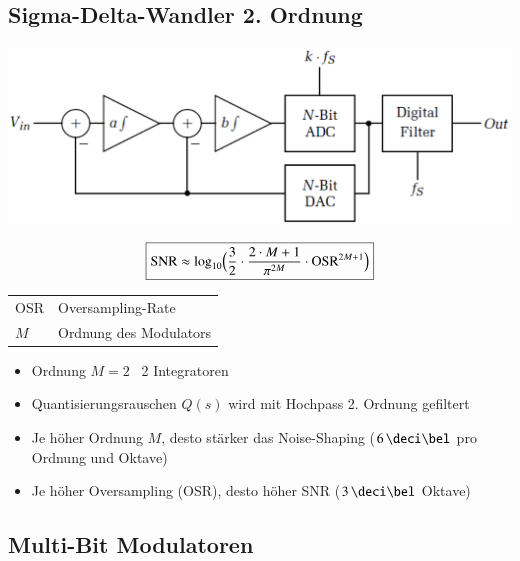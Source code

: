 \subsection{Sigma-Delta-Wandler 2. Ordnung}

\begin{minipage}[c]{0.48\columnwidth}
    \includegraphics[width=\columnwidth]{images/sigma-delta-wandler_ordnung_2.png}
\end{minipage}
\hfill
\begin{minipage}[c]{0.48\columnwidth}
    $$ \boxed{ \text{SNR} \approx \log_{10} \Bigl( \frac{3}{2} \cdot \frac{2 \cdot M + 1}{\pi^{2M}} \cdot \text{OSR}^{2M+1} \Bigr) } $$
    \begin{tabular}{ll}
        OSR & Oversampling-Rate \\
        $M$ & Ordnung des Modulators
    \end{tabular}
\end{minipage}

\begin{itemize}
    \item Ordnung $M = 2$ \textrightarrow\ 2 Integratoren
    \item Quantisierungsrauschen $Q(s)$ wird mit Hochpass 2. Ordnung gefiltert
    \item Je höher Ordnung $M$, desto stärker das Noise-Shaping ($6 \, \deci \bel$ pro Ordnung und Oktave)
    \item Je höher Oversampling (OSR), desto höher SNR ($3 \, \deci \bel$ Oktave)
\end{itemize}



\subsection{Multi-Bit Modulatoren}